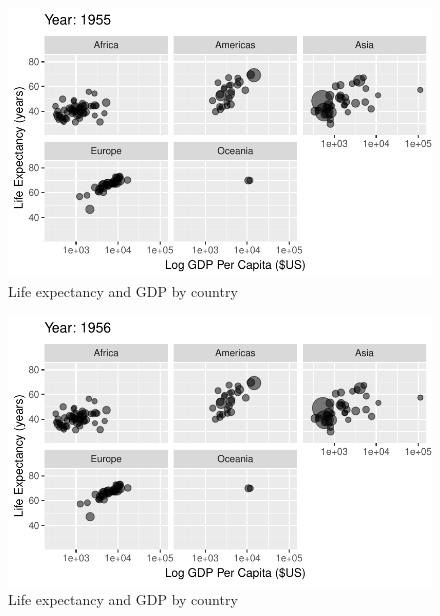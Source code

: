 \documentclass[
  letterpaper,
  DIV=11,
  numbers=noendperiod]{scrreport}
\theoremstyle{definition}
\theoremstyle{remark}
\begin{document}
\begin{figure}

{\centering \includegraphics{index_files/figure-pdf/fig-anim-lifegdp-7.pdf}

}

\caption{\label{fig-anim-lifegdp-7}Life expectancy and GDP by country}

\end{figure}

\begin{figure}

{\centering \includegraphics{index_files/figure-pdf/fig-anim-lifegdp-8.pdf}

}

\caption{\label{fig-anim-lifegdp-8}Life expectancy and GDP by country}

\end{figure}
\end{document}
